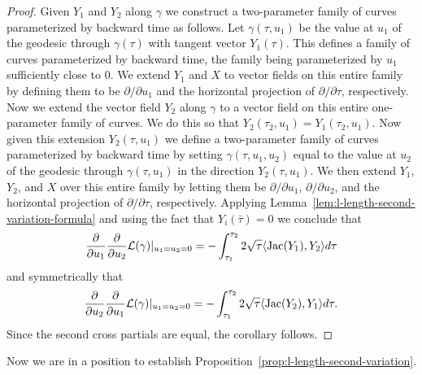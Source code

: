 \begin{proof}
\sketch

Given $Y_1$ and $Y_2$ along $\gamma$ we construct a two-parameter
family of curves parameterized by backward time as follows. Let
$\gamma(\tau,u_1)$ be the value at $u_1$ of the geodesic through
$\gamma(\tau)$ with tangent vector $Y_1(\tau)$. This defines a
family of curves parameterized by backward time, the family being
parameterized by  $u_1$ sufficiently close to $0$. We extend
 $Y_1$ and $X$ to vector fields on this entire family by defining them to be
 $\partial/\partial u_1$ and the
horizontal projection of $\partial/\partial \tau$, respectively.
 Now we
extend the vector field $Y_2$ along $\gamma$ to a vector field on
this entire one-parameter family of curves. We do this so that
$Y_2(\tau_2,u_1)=Y_1(\tau_2,u_1)$. Now given this extension
$Y_2(\tau,u_1)$ we define a two-parameter family of curves
parameterized by backward time
 by setting $\gamma(\tau,u_1,u_2)$ equal to the value at $u_2$ of the geodesic
 through $\gamma(\tau,u_1)$ in the direction $Y_2(\tau,u_1)$.
 We then extend  $Y_1$, $Y_2$, and $X$ over this entire family by letting them be
 $\partial/\partial u_1$,
$\partial/\partial u_2$, and the horizontal projection of $\partial/ \partial
\tau$, respectively. Applying Lemma~\ref{lem:l-length-second-variation-formula} and using the fact that
$Y_i(\bar\tau)=0$ we conclude that
$$\frac{\partial}{\partial u_1}\frac{\partial}{\partial u_2}{\mathcal L}(\gamma)|_{u_1=u_2=0}= -\int_{\tau_1}^{\tau_2}2\sqrt{\tau}\langle
\operatorname{Jac}(Y_1),Y_2\rangle d\tau$$ and symmetrically that
$$\frac{\partial}{\partial u_2}\frac{\partial}{\partial u_1}{\mathcal L}(\gamma)|_{u_1=u_2=0}= -\int_{\tau_1}^{\tau_2}2\sqrt{\tau}\langle
\operatorname{Jac}(Y_2),Y_1\rangle d\tau.$$ Since the second cross partials
are equal, the corollary follows.
\end{proof}





Now we are in a position to establish Proposition~\ref{prop:l-length-second-variation}.


